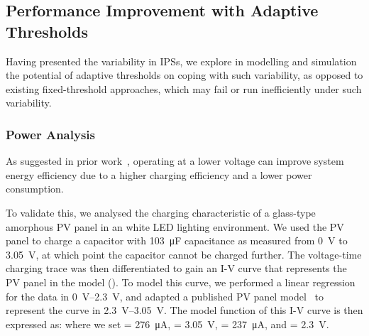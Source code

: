 \subsection{Performance Improvement with Adaptive Thresholds}

Having presented the variability in IPSs, we explore in modelling and simulation the potential of adaptive thresholds on coping with such variability, as opposed to existing fixed-threshold approaches, which may fail or run inefficiently under such variability.


\subsubsection{Power Analysis}

As suggested in prior work~\cite{gomez2016dynamic, pan2017maximize}, operating at a lower voltage can improve system energy efficiency due to a higher charging efficiency and a lower power consumption.

To validate this, we analysed the charging characteristic of a glass-type amorphous PV panel in an white LED lighting environment. 
We used the PV panel to charge a capacitor with \SI{103}{\micro\farad} capacitance as measured from \SI{0}{\volt} to \SI{3.05}{\volt}, at which point the capacitor cannot be charged further. 
The voltage-time charging trace was then differentiated to gain an I-V curve that represents the PV panel in the model (). 
To model this curve, we performed a linear regression for the data in \SIrange{0}{2.3}{\volt}, and adapted a published PV panel model~\cite{en9050326} to represent the curve in \SIrange{2.3}{3.05}{\volt}.
The model function of this I-V curve is then expressed as:
where we set  = \SI{276}{\micro\ampere},  = \SI{3.05}{\volt},  = \SI{237}{\micro\ampere}, and  = \SI{2.3}{\volt}.

